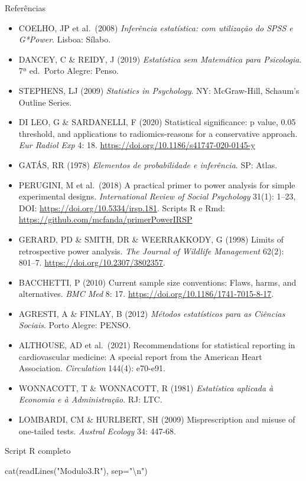 \documentclass[
  ignorenonframetext,
]{beamer}
\newenvironment{Shaded}{}{}
\newcommand{\AttributeTok}[1]{\textcolor[rgb]{0.49,0.56,0.16}{#1}}
\newcommand{\FunctionTok}[1]{\textcolor[rgb]{0.02,0.16,0.49}{#1}}
\newcommand{\NormalTok}[1]{#1}
\newcommand{\SpecialCharTok}[1]{\textcolor[rgb]{0.25,0.44,0.63}{#1}}
\newcommand{\StringTok}[1]{\textcolor[rgb]{0.25,0.44,0.63}{#1}}
\providecommand{\tightlist}{%
  \setlength{\itemsep}{0pt}\setlength{\parskip}{0pt}}
\begin{document}
\begin{frame}{Referências}
\protect\hypertarget{referuxeancias}{}
\begin{itemize}
\tightlist
\item
  COELHO, JP et al.~(2008) \emph{Inferência estatística: com utilização
  do SPSS e G*Power}. Lisboa: Sílabo.
\item
  DANCEY, C \& REIDY, J (2019) \emph{Estatística sem Matemática para
  Psicologia}. 7ª ed.~Porto Alegre: Penso.
\item
  STEPHENS, LJ (2009) \emph{Statistics in Psychology}. NY: McGraw-Hill,
  Schaum's Outline Series.
\item
  DI LEO, G \& SARDANELLI, F (2020) Statistical significance: p value,
  0.05 threshold, and applications to radiomics-reasons for a
  conservative approach. \emph{Eur Radiol Exp} 4: 18.
  \url{https://doi.org/10.1186/s41747-020-0145-y}
\item
  GATÁS, RR (1978) \emph{Elementos de probabilidade e inferência}. SP:
  Atlas.
\item
  PERUGINI, M et al.~(2018) A practical primer to power analysis for
  simple experimental designs. \emph{International Review of Social
  Psychology} 31(1): 1--23, DOI: \url{https://doi.org/10.5334/irsp.181}.
  Scripts R e Rmd: \url{https://github.com/mcfanda/primerPowerIRSP}
\item
  GERARD, PD \& SMITH, DR \& WEERRAKKODY, G (1998) Limits of
  retrospective power analysis. \emph{The Journal of Wildlife
  Management} 62(2): 801--7. \url{https://doi.org/10.2307/3802357}.
\item
  BACCHETTI, P (2010) Current sample size conventions: Flaws, harms, and
  alternatives. \emph{BMC Med} 8: 17.
  \url{https://doi.org/10.1186/1741-7015-8-17}.
\item
  AGRESTI, A \& FINLAY, B (2012) \emph{Métodos estatísticos para as
  Ciências Sociais}. Porto Alegre: PENSO.
\item
  ALTHOUSE, AD et al.~(2021) Recommendations for statistical reporting
  in cardiovascular medicine: A special report from the American Heart
  Association. \emph{Circulation} 144(4): e70-e91.
\item
  WONNACOTT, T \& WONNACOTT, R (1981) \emph{Estatística aplicada à
  Economia e à Administração}. RJ: LTC.
\item
  LOMBARDI, CM \& HURLBERT, SH (2009) Misprescription and misuse of
  one-tailed tests. \emph{Austral Ecology} 34: 447-68.
\end{itemize}
\end{frame}

\begin{frame}[fragile]{Script R completo}
\protect\hypertarget{script-r-completo}{}
\begin{Shaded}
\begin{Highlighting}[]
  \FunctionTok{cat}\NormalTok{(}\FunctionTok{readLines}\NormalTok{(}\StringTok{"Modulo3.R"}\NormalTok{), }\AttributeTok{sep=}\StringTok{"}\SpecialCharTok{\textbackslash{}n}\StringTok{"}\NormalTok{)}
\end{Highlighting}
\end{Shaded}
\end{frame}
\end{document}
